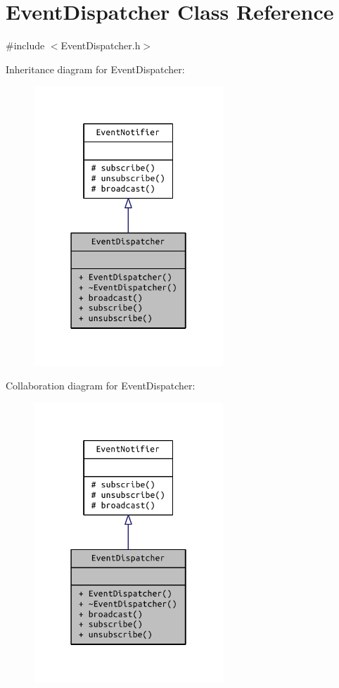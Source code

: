 \hypertarget{class_event_dispatcher}{}\section{Event\+Dispatcher Class Reference}
\label{class_event_dispatcher}


{\ttfamily \#include $<$Event\+Dispatcher.\+h$>$}



Inheritance diagram for Event\+Dispatcher\+:
\nopagebreak
\begin{figure}[H]
\begin{center}
\leavevmode
\includegraphics[width=202pt]{class_event_dispatcher__inherit__graph}
\end{center}
\end{figure}


Collaboration diagram for Event\+Dispatcher\+:
\nopagebreak
\begin{figure}[H]
\begin{center}
\leavevmode
\includegraphics[width=202pt]{class_event_dispatcher__coll__graph}
\end{center}
\end{figure}
